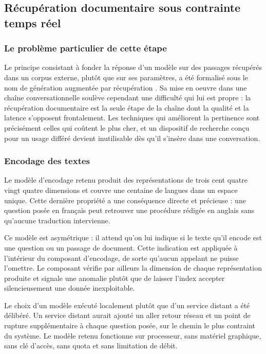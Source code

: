 \subsection{Récupération documentaire sous contrainte temps réel}

\subsubsection{Le problème particulier de cette étape}

Le principe consistant à fonder la réponse d'un modèle sur des passages récupérés dans un corpus externe, plutôt que sur ses paramètres, a été formalisé sous le nom de génération augmentée par récupération \cite{lewis}. Sa mise en oeuvre dans une chaîne conversationnelle soulève cependant une difficulté qui lui est propre : la récupération documentaire est la seule étape de la chaîne dont la qualité et la latence s'opposent frontalement. Les techniques qui améliorent la pertinence sont précisément celles qui coûtent le plus cher, et un dispositif de recherche conçu pour un usage différé devient inutilisable dès qu'il s'insère dans une conversation.

\subsubsection{Encodage des textes}

Le modèle d'encodage retenu \cite{e5} produit des représentations de trois cent quatre vingt quatre dimensions et couvre une centaine de langues dans un espace unique. Cette dernière propriété a une conséquence directe et précieuse : une question posée en français peut retrouver une procédure rédigée en anglais sans qu'aucune traduction intervienne.

Ce modèle est asymétrique : il attend qu'on lui indique si le texte qu'il encode est une question ou un passage de document. Cette indication est appliquée à l'intérieur du composant d'encodage, de sorte qu'aucun appelant ne puisse l'omettre. Le composant vérifie par ailleurs la dimension de chaque représentation produite et signale une anomalie plutôt que de laisser l'index accepter silencieusement une donnée inexploitable.

Le choix d'un modèle exécuté localement plutôt que d'un service distant a été délibéré. Un service distant aurait ajouté un aller retour réseau et un point de rupture supplémentaire à chaque question posée, sur le chemin le plus contraint du système. Le modèle retenu fonctionne sur processeur, sans matériel graphique, sans clé d'accès, sans quota et sans limitation de débit.

